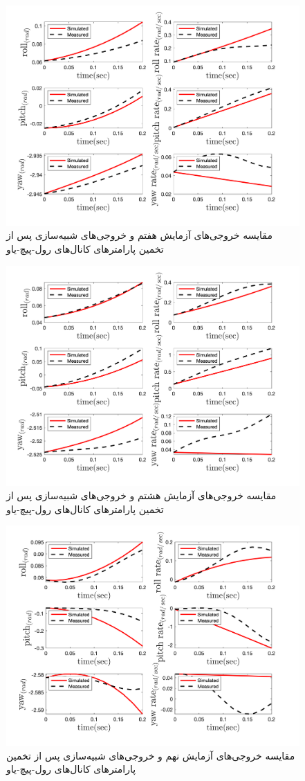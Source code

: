 \begin{figure}[H]
	\includegraphics[width=12cm]{../../Figures/RCP/roll_pitch_yaw_parameter_estimation/RCP_roll_pitch_yaw_S8.png}
	\centering
	\caption{مقايسه خروجی‌های آزمايش هفتم و خروجی‌های شبیه‌سازی پس از تخمین پارامترهای کانال‌های رول-پیچ-یاو}
	\label{ roll_pitch_yaw_ps7}
\end{figure}
\begin{figure}[H]
	\includegraphics[width=12cm]{../../Figures/RCP/roll_pitch_yaw_parameter_estimation/RCP_roll_pitch_yaw_S9.png}
	\centering
	\caption{مقايسه خروجی‌های آزمايش هشتم و خروجی‌های شبیه‌سازی پس از تخمین پارامترهای کانال‌های رول-پیچ-یاو}
	\label{ roll_pitch_yaw_ps8}
\end{figure}
\begin{figure}[H]
	\includegraphics[width=12cm]{../../Figures/RCP/roll_pitch_yaw_parameter_estimation/RCP_roll_pitch_yaw_S10.png}
	\centering
	\caption{مقايسه خروجی‌های آزمايش نهم و خروجی‌های شبیه‌سازی پس از تخمین پارامترهای کانال‌های رول-پیچ-یاو}
	\label{ roll_pitch_yaw_ps9}
\end{figure}
